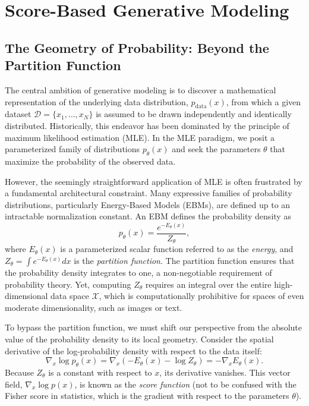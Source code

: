 \chapter{Score-Based Generative Modeling}
\label{chap:score_matching}

\section{The Geometry of Probability: Beyond the Partition Function}

The central ambition of generative modeling is to discover a mathematical representation of the underlying data distribution, $p_{\text{data}}(x)$, from which a given dataset $\mathcal{D} = \{x_1, \dots, x_N\}$ is assumed to be drawn independently and identically distributed. Historically, this endeavor has been dominated by the principle of maximum likelihood estimation (MLE). In the MLE paradigm, we posit a parameterized family of distributions $p_\theta(x)$ and seek the parameters $\theta$ that maximize the probability of the observed data.

However, the seemingly straightforward application of MLE is often frustrated by a fundamental architectural constraint. Many expressive families of probability distributions, particularly Energy-Based Models (EBMs), are defined up to an intractable normalization constant. An EBM defines the probability density as
\begin{equation}
    p_\theta(x) = \frac{e^{-E_\theta(x)}}{Z_\theta},
\end{equation}
where $E_\theta(x)$ is a parameterized scalar function referred to as the \textit{energy}, and $Z_\theta = \int e^{-E_\theta(x)} dx$ is the \textit{partition function}. The partition function ensures that the probability density integrates to one, a non-negotiable requirement of probability theory. Yet, computing $Z_\theta$ requires an integral over the entire high-dimensional data space $\mathcal{X}$, which is computationally prohibitive for spaces of even moderate dimensionality, such as images or text.

To bypass the partition function, we must shift our perspective from the absolute value of the probability density to its local geometry. Consider the spatial derivative of the log-probability density with respect to the data itself:
\begin{equation}
    \nabla_x \log p_\theta(x) = \nabla_x \left( -E_\theta(x) - \log Z_\theta \right) = -\nabla_x E_\theta(x).
\end{equation}
Because $Z_\theta$ is a constant with respect to $x$, its derivative vanishes. This vector field, $\nabla_x \log p(x)$, is known as the \textit{score function} (not to be confused with the Fisher score in statistics, which is the gradient with respect to the parameters $\theta$). 

